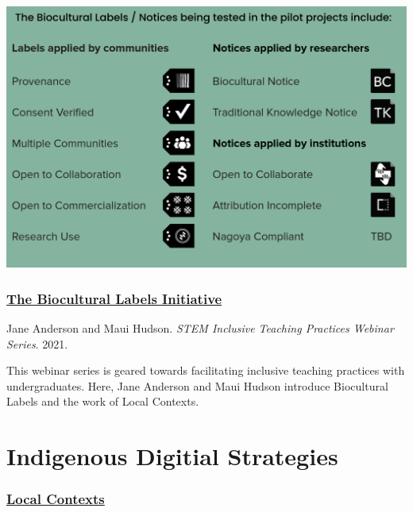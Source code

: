 \documentclass[
]{book}
\begin{document}
\includegraphics[width=21.36in]{images/biocultural_labels}

\hypertarget{the-biocultural-labels-initiative}{%
\subsubsection*{\texorpdfstring{\href{https://qubeshub.org/publications/2326/1}{The Biocultural Labels Initiative}}{The Biocultural Labels Initiative}}\label{the-biocultural-labels-initiative}}

Jane Anderson and Maui Hudson. \emph{STEM Inclusive Teaching Practices Webinar Series}. 2021.

This webinar series is geared towards facilitating inclusive teaching practices with undergraduates. Here, Jane Anderson and Maui Hudson introduce Biocultural Labels and the work of Local Contexts.

\hypertarget{indigenous-digitial-strategies}{%
\section{Indigenous Digitial Strategies}\label{indigenous-digitial-strategies}}

\hypertarget{local-contexts}{%
\subsubsection*{\texorpdfstring{\href{https://localcontexts.org/labels/biocultural-labels/}{Local Contexts}}{Local Contexts}}\label{local-contexts}}
\end{document}
